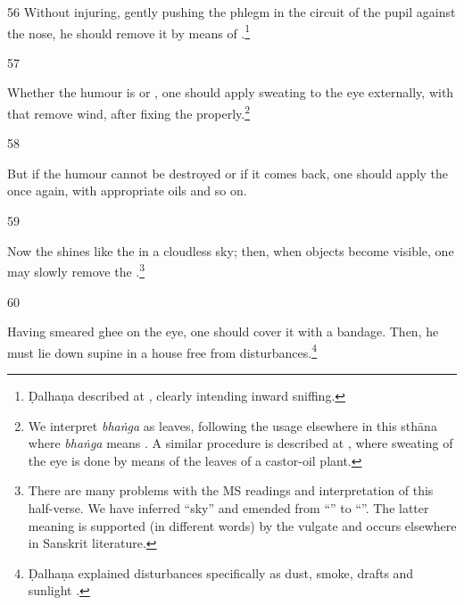 \begin{translation}
    \item[56]
    Without injuring, gently pushing the phlegm in the circuit of the pupil against the nose, he 
    should remove it by means of .\footnote{Ḍalhaṇa described 
     at 
    , clearly intending inward sniffing.}
    
    
    
    \item[57]
    
    
    
    Whether the humour is  or , one should apply
    sweating to the eye externally, with  that remove wind, after
    fixing the  properly.\footnote{We interpret \emph{bhaṅga} as
    leaves, following the usage elsewhere in this sthāna 
    where \emph{bhaṅga} means . A similar procedure is
    described at , where sweating of the eye is done by means 
    of the
    leaves of a castor-oil plant.}
    
    
    \item[58]
    
    But if the humour cannot be destroyed or if it comes back, one should apply the
     once again, with appropriate oils and so on.
    
    
    \item[59]
    
    
    Now the  shines like the  in a cloudless sky; then, 
    when objects become visible, one may slowly remove the 
    .\footnote{There are many problems with the MS readings and 
    interpretation of this half-verse.  We have inferred “sky” and emended from 
    “” to “”.  The 
    latter 
    meaning is supported (in different words) by the vulgate and occurs elsewhere in Sanskrit 
    literature.}
    
    \item[60]
    
    Having smeared ghee on the eye, one should cover it with a bandage.  Then, he must lie 
    down supine in a house free from disturbances.\footnote{Ḍalhaṇa explained disturbances 
    specifically as dust, smoke, drafts and sunlight .} 
    

\end{translation}
